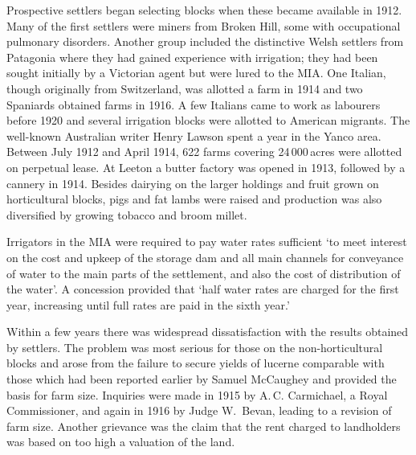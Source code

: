 Prospective settlers began selecting blocks when these became
available in 1912.  Many of the first settlers were miners from Broken
Hill, some with occupational pulmonary disorders.  Another group
included the distinctive Welsh settlers from Patagonia where they had
gained experience with irrigation; they had been sought initially by a
Victorian agent but were lured to the MIA.  One Italian, though
originally from Switzerland, was allotted a farm in 1914 and two
Spaniards obtained farms in 1916.  A few Italians came to work as
labourers before 1920 and several irrigation blocks were allotted to
American migrants.  The well-known Australian writer Henry Lawson
spent a year in the Yanco area.  Between July 1912 and April 1914, 622
farms covering 24\,000\,acres were allotted on perpetual lease.  At
Leeton a butter factory was opened in 1913, followed by a cannery in
1914.  Besides dairying on the larger holdings and fruit grown on
horticultural blocks, pigs and fat lambs were raised and production
was also diversified by growing tobacco and broom
millet.

Irrigators in the MIA were required to pay water rates sufficient `to
meet interest on the cost and upkeep of the storage dam and all main
channels for conveyance of water to the main parts of the settlement,
and also the cost of distribution of the water'. A concession provided
that `half water rates are charged for the first year, increasing
until full rates are paid in the sixth year.'

Within a few years there was widespread dissatisfaction with the
results obtained by settlers.  The problem was most serious for those
on the non-horticultural blocks and arose from the failure to secure
yields of lucerne comparable with those which had been reported
earlier by Samuel McCaughey and provided the basis for farm size.
Inquiries were made in 1915 by A.\,C. Carmichael, a Royal
Commissioner, and again in 1916 by Judge W.~Bevan, leading to a
revision of farm size.  Another grievance was the claim that the rent
charged to landholders was based on too high a valuation of the
land.

